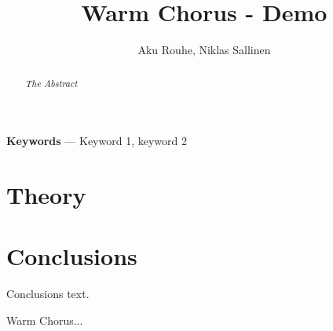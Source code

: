 \documentclass[11pt,a4paper,twoside]{article}
\title{Warm Chorus -  Demo}
\author{Aku Rouhe, Niklas Sallinen}
\begin{document}
\maketitle

\begin{abstract}
\noindent\it The Abstract
\end{abstract}

\noindent\textbf{Keywords} --- Keyword 1, keyword 2



\section{Theory}












\clearpage
\section{Conclusions}

Conclusions text.




%
%

\clearpage
\begin{thebibliography}{99}
 Warm Chorus...
\end{thebibliography}
\end{document}
